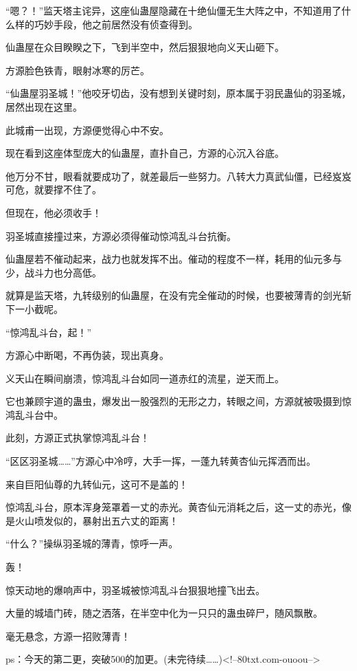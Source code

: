 \begin{this_body}
“嗯？！”监天塔主诧异，这座仙蛊屋隐藏在十绝仙僵无生大阵之中，不知道用了什么样的巧妙手段，他之前居然没有侦查得到。

仙蛊屋在众目睽睽之下，飞到半空中，然后狠狠地向义天山砸下。

方源脸色铁青，眼射冰寒的厉芒。

“仙蛊屋羽圣城！”他咬牙切齿，没有想到关键时刻，原本属于羽民蛊仙的羽圣城，居然出现在这里。

此城甫一出现，方源便觉得心中不安。

现在看到这座体型庞大的仙蛊屋，直扑自己，方源的心沉入谷底。

他万分不甘，眼看就要成功了，就差最后一些努力。八转大力真武仙僵，已经岌岌可危，就要撑不住了。

但现在，他必须收手！

羽圣城直接撞过来，方源必须得催动惊鸿乱斗台抗衡。

仙蛊屋若不催动起来，战力也就发挥不出。催动的程度不一样，耗用的仙元多与少，战斗力也分高低。

就算是监天塔，九转级别的仙蛊屋，在没有完全催动的时候，也要被薄青的剑光斩下一小截呢。

“惊鸿乱斗台，起！”

方源心中断喝，不再伪装，现出真身。

义天山在瞬间崩溃，惊鸿乱斗台如同一道赤红的流星，逆天而上。

它也兼顾宇道的蛊虫，爆发出一股强烈的无形之力，转眼之间，方源就被吸摄到惊鸿乱斗台中。

此刻，方源正式执掌惊鸿乱斗台！

“区区羽圣城……”方源心中冷哼，大手一挥，一蓬九转黄杏仙元挥洒而出。

来自巨阳仙尊的九转仙元，这可不是盖的！

惊鸿乱斗台，原本浑身笼罩着一丈的赤光。黄杏仙元消耗之后，这一丈的赤光，像是火山喷发似的，暴射出五六丈的距离！

“什么？”操纵羽圣城的薄青，惊呼一声。

轰！

惊天动地的爆响声中，羽圣城被惊鸿乱斗台狠狠地撞飞出去。

大量的城墙门砖，随之洒落，在半空中化为一只只的蛊虫碎尸，随风飘散。

毫无悬念，方源一招败薄青！

ps：今天的第二更，突破500的加更。(未完待续……)<!--80txt.com-ouoou-->

\end{this_body}

